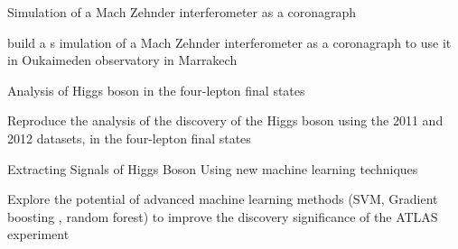 


\begin{cventries}
          \cventry
      {Simulation of a Mach Zehnder interferometer as a coronagraph} %
    { } %
    {} %
    {} %
    {
      \begin{cvitems} %
        \item {build a s imulation of a Mach Zehnder interferometer as a coronagraph to use it in Oukaimeden observatory in Marrakech}
        \end{cvitems}
    }

  \cventry
      {Analysis of Higgs boson in the four-lepton final states} %
    {} %
    {} %
    {} %
    {
      \begin{cvitems} %
        \item {Reproduce the analysis of the discovery of the Higgs boson using the 2011 and 2012 datasets, in the four-lepton final states}
        \end{cvitems}
    }
      \cventry
      {Extracting Signals of Higgs Boson Using new  machine learning techniques } %
    { } %
    {} %
    {} %
    {
      \begin{cvitems} %
        \item {Explore the potential of advanced machine learning methods (SVM, Gradient boosting , random forest) to improve the discovery significance of the ATLAS experiment}
        \end{cvitems}
    }
    
 

 

 
 

\end{cventries}
